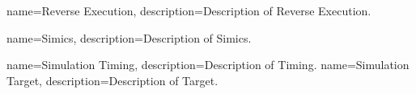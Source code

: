 {
  name=Reverse Execution,
  description={Description of Reverse Execution.}
}
\newcommand{\dvttermreverseexecution}{\dvtcmdcaponcegloss{dvtglossreverseexecution}{Reverse Execution}}
\newcommand{\dvttermreferenceimplementation}{Reference Implementation} %
\newcommand{\dvttermreferencesolution}{Reference Solution} %

\newcommand{\dvttermsoftwarerendering}{\dvtcmdcaponce{Software Rendering}}
{
  name=Simics,
  description={Description of Simics.}
}
\newcommand{\dvttermsimics}{\gls{dvtglosssimics}}

\newcommand{\dvttermttm}{\dvtcmdabbrev{dvtglossttm}}
{
  name=Simulation Timing,
  description={Description of Timing.}
}
\newcommand{\dvttermtiming}{\dvtcmdcaponcegloss{dvtglosstiming}{Timing}}
{
  name=Simulation Target,
  description={Description of Target.}
}
\newcommand{\dvttermtarget}{\dvtcmdcaponcegloss{dvtglosstarget}{Target}}


\newcommand{\dvttermwarp}{\dvttermmicrosoft\ \dvtcmdabbrev{dvtglosswarp}}


